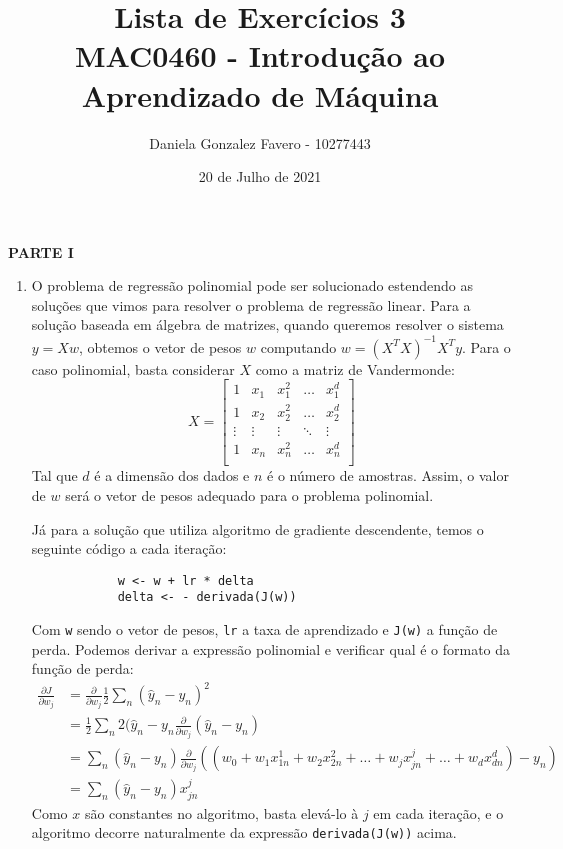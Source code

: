 \documentclass[a4paper,11pt]{article}
\title{%
    Lista de Exercícios 3\\
    \large MAC0460 - Introdução ao Aprendizado de Máquina
}
\author{Daniela Gonzalez Favero - 10277443}
\date{20 de Julho de 2021}
\begin{document}
    \maketitle
    
    \textbf{PARTE I}
    \begin{enumerate}
        \item O problema de regressão polinomial pode ser solucionado estendendo as soluções que vimos para resolver o problema de regressão linear. Para a solução baseada em álgebra de matrizes, quando queremos resolver o sistema $y = Xw$, obtemos o vetor de pesos $w$ computando $w = (X^TX)^{-1}X^Ty$. Para o caso polinomial, basta considerar $X$ como a matriz de Vandermonde:
        \[
            X = 
            \begin{bmatrix}
                     1 &    x_1 &  x_1^2 & \hdots &  x_1^d \\
                     1 &    x_2 &  x_2^2 & \hdots &  x_2^d \\
                \vdots & \vdots & \vdots & \ddots & \vdots \\
                     1 &    x_n &  x_n^2 & \hdots &  x_n^d \\
            \end{bmatrix}
        \]
        Tal que $d$ é a dimensão dos dados e $n$ é o número de amostras. Assim, o valor de $w$ será o vetor de pesos adequado para o problema polinomial.
        
        Já para a solução que utiliza algoritmo de gradiente descendente, temos o seguinte código a cada iteração:
        \begin{verbatim}
            w <- w + lr * delta
            delta <- - derivada(J(w))
        \end{verbatim}
        
        Com \texttt{w} sendo o vetor de pesos, \texttt{lr} a taxa de aprendizado e \texttt{J(w)} a função de perda. Podemos derivar a expressão polinomial e verificar qual é o formato da função de perda:
        \[
            \begin{array}{lll}
                \frac{\partial J}{\partial w_j} & = \frac{\partial}{\partial w_j} \frac{1}{2} \sum_n (\hat{y}_n - y_n)^2 \\
                & = \frac{1}{2}  \sum_n 2(\hat{y}_n- y_n \frac{\partial}{\partial w_j} (\hat{y}_n - y_n) \\
                & = \sum_n(\hat{y}_n- y_n) \frac{\partial}{\partial w_j} ((w_0 + w_1 x_{1n}^1 + w_2 x_{2n}^2 + \dots + w_j x_{jn}^j + \dots + w_d x_{dn}^d) - y_n) \\
                & = \sum_n(\hat{y}_n- y_n)x_{jn}^j
            \end{array}
        \]
        Como $x$ são constantes no algoritmo, basta elevá-lo à $j$ em cada iteração, e o algoritmo decorre naturalmente da expressão \texttt{derivada(J(w))} acima.
        

\end{enumerate}
\end{document}
